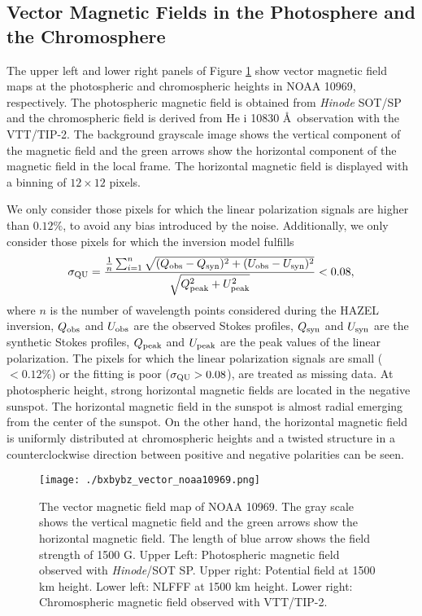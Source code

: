 \documentclass[manuscript]{aastex61}
\begin{document}
\subsection{Vector Magnetic Fields in the Photosphere and the Chromosphere
\label{sec3:photo_chrom}}
The upper left and lower right panels of Figure \ref{sec3:bxbybz_noaa10969}
show vector magnetic field maps at the photospheric and chromospheric heights
in NOAA 10969, respectively. The photospheric magnetic field is obtained from 
{\it Hinode} SOT/SP and the chromospheric field is derived from He {\sc i} 10830
\AA \ observation with the VTT/TIP-2. The background grayscale image shows the vertical
component of the magnetic field and the green arrows show the horizontal component of the magnetic field in the local frame. 
The horizontal magnetic field is displayed with a binning of $12\times12$ pixels. 

We only consider those pixels for which the linear polarization signals are
higher than $0.12\%$, to avoid any bias introduced by the noise.
Additionally, we only consider those pixels for which the inversion model
fulfills
\begin{equation}
\sigma_{\rm QU}=\frac{\frac{1}{n}\sum_{i=1}^{n} \sqrt{(Q_{\rm obs}-Q_{\rm syn})^2+(U_{\rm obs}-U_{\rm syn})^2}}{\sqrt{Q_{\rm peak}^2+U_{\rm peak}^2}}<0.08,
\label{qufit}
\end{equation}
where $n$ is the number of wavelength points considered during the HAZEL inversion, 
$Q_{\rm obs}$ and $U_{\rm obs}$ are the observed
Stokes profiles, $Q_{\rm syn}$ and $U_{\rm syn}$ are the synthetic Stokes
profiles, $Q_{\rm peak}$ and $U_{\rm peak}$ are the peak values of the linear
polarization. The pixels for which the linear polarization signals are small 
($<0.12\%$) or the fitting is poor ($\sigma_{\rm QU}> 0.08$), are treated as missing data. 
At photospheric height, strong horizontal magnetic fields are located in the negative
sunspot. The horizontal magnetic field in the sunspot is almost radial emerging from the
center of the sunspot. On the other hand, the horizontal magnetic field is
uniformly distributed at chromospheric heights and a twisted structure in a counterclockwise direction between positive and negative polarities can be seen.
\begin{figure}
\texttt{[image: ./bxbybz\_vector\_noaa10969.png]}
\caption{ The vector magnetic field map of NOAA 10969. The gray scale shows the vertical magnetic field and the green arrows show the horizontal magnetic field. The length of blue arrow shows the field strength of 1500 G. Upper Left: Photospheric magnetic field observed with {\it Hinode}/SOT SP. Upper right: Potential field at 1500 km height. Lower left: NLFFF at 1500 km height. Lower right: Chromospheric magnetic field observed with VTT/TIP-2.}
\label{sec3:bxbybz_noaa10969}
\end{figure}
\end{document}

